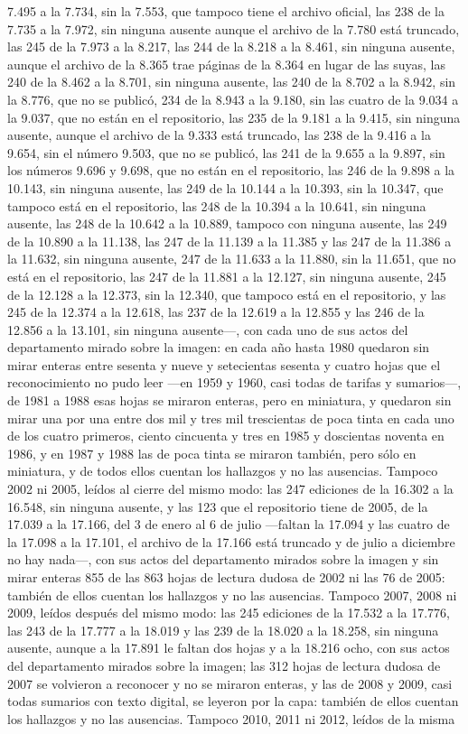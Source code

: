7.495 a la 7.734, sin la 7.553, que tampoco tiene el archivo oficial, las 238 de la 7.735 a la 7.972, sin ninguna ausente aunque el archivo de la 7.780 está truncado, las 245 de la 7.973 a la 8.217, las 244 de la 8.218 a la 8.461, sin ninguna ausente, aunque el archivo de la 8.365 trae páginas de la 8.364 en lugar de las suyas, las 240 de la 8.462 a la 8.701, sin ninguna ausente, las 240 de la 8.702 a la 8.942, sin la 8.776, que no se publicó, 234 de la 8.943 a la 9.180, sin las cuatro de la 9.034 a la 9.037, que no están en el repositorio, las 235 de la 9.181 a la 9.415, sin ninguna ausente, aunque el archivo de la 9.333 está truncado, las 238 de la 9.416 a la 9.654, sin el número 9.503, que no se publicó, las 241 de la 9.655 a la 9.897, sin los números 9.696 y 9.698, que no están en el repositorio, las 246 de la 9.898 a la 10.143, sin ninguna ausente, las 249 de la 10.144 a la 10.393, sin la 10.347, que tampoco está en el repositorio, las 248 de la 10.394 a la 10.641, sin ninguna ausente, las 248 de la 10.642 a la 10.889, tampoco con ninguna ausente, las 249 de la 10.890 a la 11.138, las 247 de la 11.139 a la 11.385 y las 247 de la 11.386 a la 11.632, sin ninguna ausente, 247 de la 11.633 a la 11.880, sin la 11.651, que no está en el repositorio, las 247 de la 11.881 a la 12.127, sin ninguna ausente, 245 de la 12.128 a la 12.373, sin la 12.340, que tampoco está en el repositorio, y las 245 de la 12.374 a la 12.618, las 237 de la 12.619 a la 12.855 y las 246 de la 12.856 a la 13.101, sin ninguna ausente---, con cada uno de sus actos del departamento mirado sobre la imagen: en cada año hasta 1980 quedaron sin mirar enteras entre sesenta y nueve y setecientas sesenta y cuatro hojas que el reconocimiento no pudo leer ---en 1959 y 1960, casi todas de tarifas y sumarios---, de 1981 a 1988 esas hojas se miraron enteras, pero en miniatura, y quedaron sin mirar una por una entre dos mil y tres mil trescientas de poca tinta en cada uno de los cuatro primeros, ciento cincuenta y tres en 1985 y doscientas noventa en 1986, y en 1987 y 1988 las de poca tinta se miraron también, pero sólo en miniatura, y de todos ellos cuentan los hallazgos y no las ausencias. Tampoco 2002 ni 2005, leídos al cierre del mismo modo: las 247 ediciones de la 16.302 a la 16.548, sin ninguna ausente, y las 123 que el repositorio tiene de 2005, de la 17.039 a la 17.166, del 3 de enero al 6 de julio ---faltan la 17.094 y las cuatro de la 17.098 a la 17.101, el archivo de la 17.166 está truncado y de julio a diciembre no hay nada---, con sus actos del departamento mirados sobre la imagen y sin mirar enteras 855 de las 863 hojas de lectura dudosa de 2002 ni las 76 de 2005: también de ellos cuentan los hallazgos y no las ausencias. Tampoco 2007, 2008 ni 2009, leídos después del mismo modo: las 245 ediciones de la 17.532 a la 17.776, las 243 de la 17.777 a la 18.019 y las 239 de la 18.020 a la 18.258, sin ninguna ausente, aunque a la 17.891 le faltan dos hojas y a la 18.216 ocho, con sus actos del departamento mirados sobre la imagen; las 312 hojas de lectura dudosa de 2007 se volvieron a reconocer y no se miraron enteras, y las de 2008 y 2009, casi todas sumarios con texto digital, se leyeron por la capa: también de ellos cuentan los hallazgos y no las ausencias. Tampoco 2010, 2011 ni 2012, leídos de la misma 